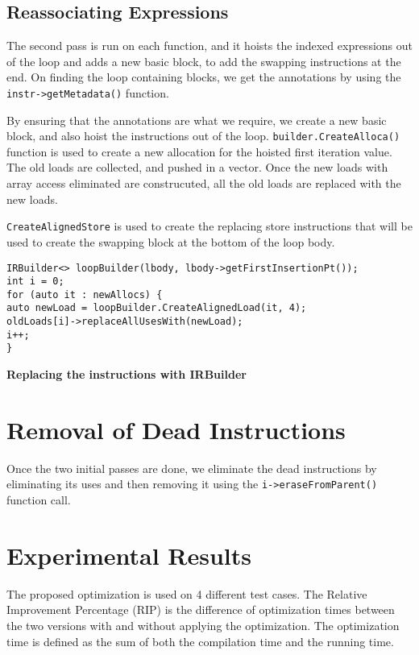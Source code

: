 \subsection{Reassociating Expressions}
The second pass is run on each function, and it hoists the indexed expressions out of the loop and adds a new basic block, to add the swapping instructions at the end. On finding the loop containing blocks, we get the annotations by using the \texttt{instr->getMetadata()} function. 

By ensuring that the annotations are what we require, we create a new basic block, and also hoist the instructions out of the loop. \texttt{builder.CreateAlloca()} function is used to create a new allocation for the hoisted first iteration value. The old loads are collected, and pushed in a vector. Once the new loads with array access eliminated are construcuted, all the old loads are replaced with the new loads. 

\texttt{CreateAlignedStore} is used to create the replacing store instructions that will be used to create the swapping block at the bottom of the loop body. 

\begin{lstlisting}
IRBuilder<> loopBuilder(lbody, lbody->getFirstInsertionPt());
int i = 0;
for (auto it : newAllocs) {
auto newLoad = loopBuilder.CreateAlignedLoad(it, 4);
oldLoads[i]->replaceAllUsesWith(newLoad);
i++;
}

\end{lstlisting}
\hspace{55pt} \textbf{Replacing the instructions with IRBuilder}

\section{Removal of Dead Instructions}
Once the two initial passes are done, we eliminate the dead instructions by eliminating its uses and then removing it using the \texttt{i->eraseFromParent()} function call.


\section{Experimental Results}
The proposed optimization is used on 4 different test cases. The Relative Improvement Percentage (RIP) is the difference of optimization times between the two versions with and without applying the optimization. The optimization time is defined as the sum of both the compilation time and the running time.

